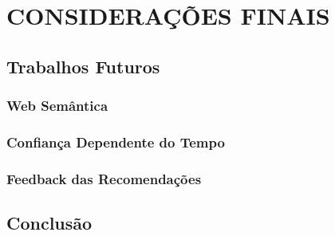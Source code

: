\chapter{CONSIDERAÇÕES FINAIS} %
\label{cha:consideracoes_finais}

\section{Trabalhos Futuros}
\label{sec:trabalho_futuros}

\subsection{Web Semântica} %
\label{sub:web_semantica}


\subsection{Confiança Dependente do Tempo} %
\label{sub:confianca_dependente_do_tempo}



\subsection{Feedback das Recomendações} %
\label{sub:feedback_das_recomendacoes}




\section{Conclusão}
\label{conclusao}


